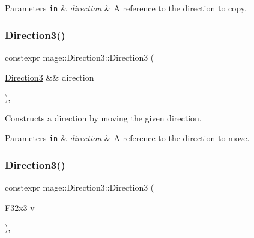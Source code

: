 \begin{DoxyParams}[1]{Parameters}
\mbox{\tt in}  & {\em direction} & A reference to the direction to copy. \\
\hline
\end{DoxyParams}
\mbox{\label{structmage_1_1_direction3_aff1506b32f2b6dd49c2747eca90c76ce}} 
\subsubsection{\texorpdfstring{Direction3()}{Direction3()}\hspace{0.1cm}{\footnotesize\ttfamily [4/5]}}
{\footnotesize\ttfamily constexpr mage\+::\+Direction3\+::\+Direction3 (\begin{DoxyParamCaption}\item[{\mbox{\hyperlink{structmage_1_1_direction3}{Direction3}} \&\&}]{direction }\end{DoxyParamCaption})\hspace{0.3cm}{\ttfamily [default]}, {\ttfamily [noexcept]}}

Constructs a direction by moving the given direction.


\begin{DoxyParams}[1]{Parameters}
\mbox{\tt in}  & {\em direction} & A reference to the direction to move. \\
\hline
\end{DoxyParams}
\mbox{\label{structmage_1_1_direction3_a9ef3fe2fd9fd55fade378d42eda597c3}} 
\subsubsection{\texorpdfstring{Direction3()}{Direction3()}\hspace{0.1cm}{\footnotesize\ttfamily [5/5]}}
{\footnotesize\ttfamily constexpr mage\+::\+Direction3\+::\+Direction3 (\begin{DoxyParamCaption}\item[{\mbox{\hyperlink{namespacemage_a0fef5ab4e073c2d9ea876fefa3da4233}{F32x3}}}]{v }\end{DoxyParamCaption})\hspace{0.3cm}{\ttfamily [explicit]}, {\ttfamily [noexcept]}}

